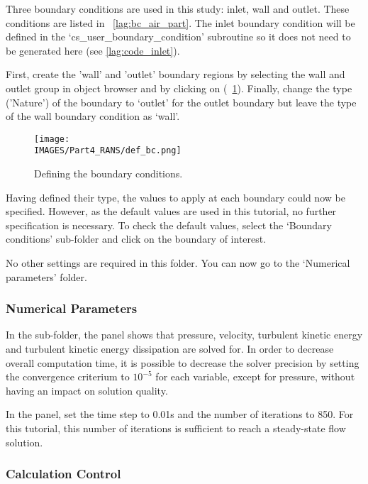 Three boundary conditions are used in this study: inlet, wall and outlet.  These conditions are listed in \tablename~\ref{lag:bc_air_part}.   The inlet boundary condition will be defined in the ‘cs\_user\_boundary\_condition’ subroutine so it does not need to be generated here (see \ref{lag:code_inlet}).

First, create the 'wall' and 'outlet' boundary regions by selecting the wall and outlet group in \salome object browser and by clicking on  (\figurename~\ref{lag:def_bc}).  Finally, change the type ('Nature') of the boundary to ‘outlet’ for the outlet boundary but leave the type of the wall boundary condition as ‘wall’.
%
\begin{figure}[H]
\centering
\texttt{[image: \\IMAGES/Part4\_RANS/def\_bc.png]}
\caption{Defining the boundary conditions.}\label{lag:def_bc}
\end{figure}
%
Having defined their type, the values to apply at each boundary could now be specified.  However, as the default values are used in this tutorial, no further specification is necessary.  To check the default values, select the ‘Boundary conditions’ sub-folder and click on the boundary of interest.

No other settings are required in this folder. You can now go to the ‘Numerical parameters’ folder.

\subsubsection{Numerical Parameters}

In the  sub-folder, the  panel shows that pressure, velocity, turbulent kinetic energy and turbulent kinetic energy dissipation are solved for. In order to decrease overall computation time, it is possible to decrease the solver precision by setting the convergence criterium to $10^{-5}$ for each variable, except for pressure, without having an impact on solution quality.

In the  panel, set the time step to 0.01s and the number of iterations to 850.  For this tutorial, this number of iterations is sufficient to reach a steady-state flow solution.

\subsubsection{Calculation Control}

